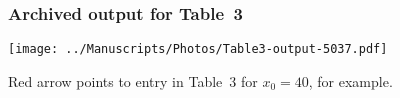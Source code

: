\begin{frame}
    \frametitle{Archived output for Table~3}
    \begin{center}
		\texttt{[image: ../Manuscripts/Photos/Table3-output-5037.pdf]}        
    \end{center}  
	\medskip
	
	Red arrow points to entry in Table~3 for $x_0=40$, for example.
\end{frame}
